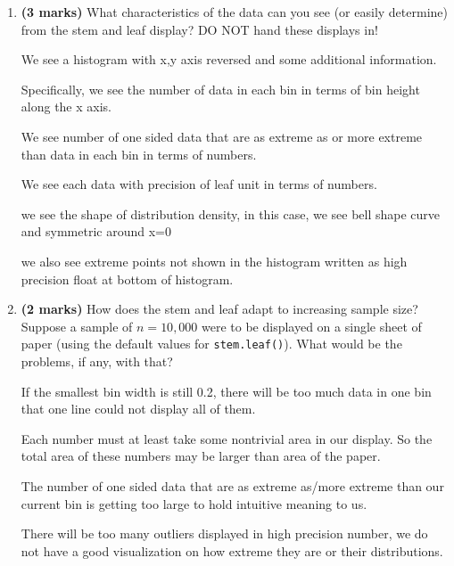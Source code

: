 \documentclass[
]{article}
\begin{document}
\begin{enumerate}
\def\labelenumi{\alph{enumi}.}
\item
  \textbf{(3 marks)} What characteristics of the data can you see (or
  easily determine) from the stem and leaf display? DO NOT hand these
  displays in!

  We see a histogram with x,y axis reversed and some additional
  information.

  Specifically, we see the number of data in each bin in terms of bin
  height along the x axis.

  We see number of one sided data that are as extreme as or more extreme
  than data in each bin in terms of numbers.

  We see each data with precision of leaf unit in terms of numbers.

  we see the shape of distribution density, in this case, we see bell
  shape curve and symmetric around x=0

  we also see extreme points not shown in the histogram written as high
  precision float at bottom of histogram.
\item
  \textbf{(2 marks)} How does the stem and leaf adapt to increasing
  sample size? Suppose a sample of \(n=10,000\) were to be displayed on
  a single sheet of paper (using the default values for
  \texttt{stem.leaf()}). What would be the problems, if any, with that?

  If the smallest bin width is still 0.2, there will be too much data in
  one bin that one line could not display all of them.

  Each number must at least take some nontrivial area in our display. So
  the total area of these numbers may be larger than area of the paper.

  The number of one sided data that are as extreme as/more extreme than
  our current bin is getting too large to hold intuitive meaning to us.

  There will be too many outliers displayed in high precision number, we
  do not have a good visualization on how extreme they are or their
  distributions.
\end{enumerate}
\end{document}
